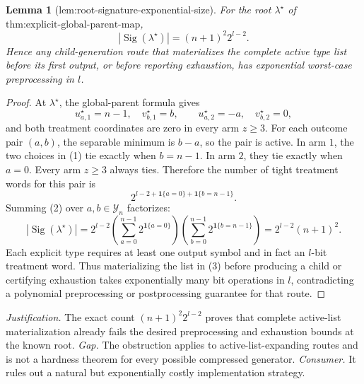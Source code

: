 \documentclass{article}
\newtheorem{lemma}{Lemma}
\begin{document}
\begin{lemma}[lem:root-signature-exponential-size]\label{lem:root-signature-exponential-size}
For the root \(\lambda^\star\) of \(\text{thm:explicit-global-parent-map}\), \[|\operatorname{Sig}(\lambda^\star)|=(n+1)^2 2^{l-2}.\] Hence any child-generation route that materializes the complete active type list before its first output, or before reporting exhaustion, has exponential worst-case preprocessing in \(l\).
\end{lemma}
\begin{proof}
At \(\lambda^\star\), the global-parent formula gives
\[u^\star_{a,1}=n-1,\quad v^\star_{b,1}=b,\qquad u^\star_{a,2}=-a,\quad v^\star_{b,2}=0,\tag{1}\]
and both treatment coordinates are zero in every arm \(z\ge3\). For each outcome pair \((a,b)\), the separable minimum is \(b-a\), so the pair is active. In arm \(1\), the two choices in (1) tie exactly when \(b=n-1\). In arm \(2\), they tie exactly when \(a=0\). Every arm \(z\ge3\) always ties. Therefore the number of tight treatment words for this pair is
\[2^{l-2+\mathbf1\{a=0\}+\mathbf1\{b=n-1\}}.\tag{2}\]
Summing (2) over \(a,b\in\mathcal Y_n\) factorizes:
\[|\operatorname{Sig}(\lambda^\star)|=2^{l-2}\left(\sum_{a=0}^{n-1}2^{\mathbf1\{a=0\}}\right)\left(\sum_{b=0}^{n-1}2^{\mathbf1\{b=n-1\}}\right)=2^{l-2}(n+1)^2.\tag{3}\]
Each explicit type requires at least one output symbol and in fact an \(l\)-bit treatment word. Thus materializing the list in (3) before producing a child or certifying exhaustion takes exponentially many bit operations in \(l\), contradicting a polynomial preprocessing or postprocessing guarantee for that route.
\end{proof}
\par\smallskip\noindent \textit{Justification.} The exact count \((n+1)^2 2^{l-2}\) proves that complete active-list materialization already fails the desired preprocessing and exhaustion bounds at the known root. \textit{Gap.} The obstruction applies to active-list-expanding routes and is not a hardness theorem for every possible compressed generator. \textit{Consumer.} It rules out a natural but exponentially costly implementation strategy.
\end{document}
